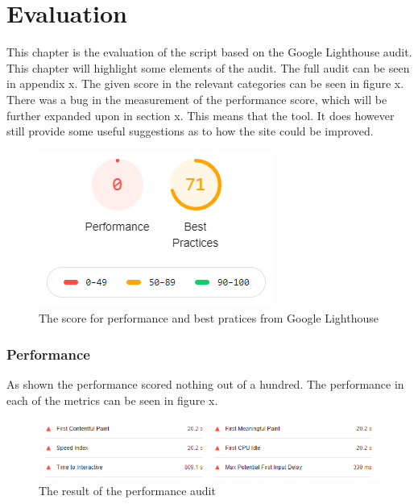 \chapter{Evaluation}
This chapter is the evaluation of the script based on the Google Lighthouse audit. This chapter will highlight some elements of the audit. The full audit can be seen in appendix x. The given score in the relevant categories can be seen in figure x. There was a bug in the measurement of the performance score, which will be further expanded upon in section x. This means that the tool. It does however still provide some useful suggestions as to how the site could be improved.




\begin{figure} [H]
	\centering
	\includegraphics[width=.8\textwidth]{Pictures/LighthouseGrade}
	\caption{The score for performance and best pratices from Google Lighthouse}
	\label{LighthouseGrade}
\end{figure}

\subsection{Performance}
As shown the performance scored nothing out of a hundred. The performance in each of the metrics can be seen in figure x.

\begin{figure} [H]
	\centering
	\includegraphics[width=.8\textwidth]{Pictures/PerformanceAuditValues}
	\caption{The result of the performance audit}
	\label{PerformanceAuditValues}
\end{figure}

